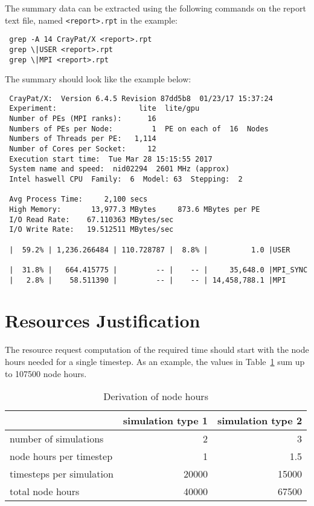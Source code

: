 \documentclass[11pt]{article}
\begin{document}
The summary data can be extracted using the following commands on the report text file, named \verb!<report>.rpt! in the example:
\begin{verbatim}
 grep -A 14 CrayPat/X <report>.rpt
 grep \|USER <report>.rpt
 grep \|MPI <report>.rpt
\end{verbatim}

The summary should look like the example below: 
\begin{verbatim}
 CrayPat/X:  Version 6.4.5 Revision 87dd5b8  01/23/17 15:37:24
 Experiment:                   lite  lite/gpu     
 Number of PEs (MPI ranks):      16
 Numbers of PEs per Node:         1  PE on each of  16  Nodes
 Numbers of Threads per PE:   1,114
 Number of Cores per Socket:     12
 Execution start time:  Tue Mar 28 15:15:55 2017
 System name and speed:  nid02294  2601 MHz (approx)
 Intel haswell CPU  Family:  6  Model: 63  Stepping:  2
 
 Avg Process Time:     2,100 secs             
 High Memory:       13,977.3 MBytes     873.6 MBytes per PE
 I/O Read Rate:    67.110363 MBytes/sec       
 I/O Write Rate:   19.512511 MBytes/sec
 
 |  59.2% | 1,236.266484 | 110.728787 |  8.8% |          1.0 |USER
 
 |  31.8% |   664.415775 |         -- |    -- |     35,648.0 |MPI_SYNC
 |   2.8% |    58.511390 |         -- |    -- | 14,458,788.1 |MPI
\end{verbatim}

\section{Resources Justification}
The resource request computation of the required time should start with the node hours needed for a single timestep.
As an example, the values in Table~\ref{table:derivation_node_hours} sum up to 107500 node hours.
\begin{table}[H]
 \begin{center}
  \begin{tabular}{lrr}
   \hline \hline
   & simulation type 1 & simulation type 2 \\ 
   \hline \hline
   number of simulations & 2 & 3 \\
   \hline
   node hours per timestep & 1 & 1.5 \\
   \hline
   timesteps per simulation & 20000 & 15000 \\
   \hline
   total node hours & 40000 & 67500 \\
   \hline \hline
  \end{tabular}
 \end{center}
 \caption{Derivation of node hours}
 \label{table:derivation_node_hours}
\end{table}
\end{document}
